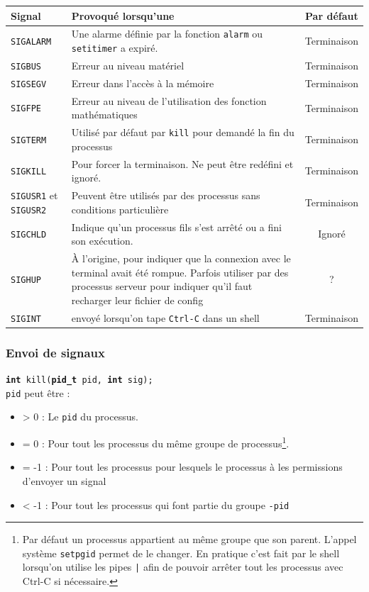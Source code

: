 \begin{tabularx}{\textwidth}{l|p{}|c}
  \textbf{Signal} & \textbf{Provoqué lorsqu'une} & \textbf{Par défaut} \\
  \hline \hline
  \texttt{SIGALARM} & Une alarme définie par la fonction \texttt{alarm} ou \texttt{setitimer} a expiré. & Terminaison \\
  \hline
  \texttt{SIGBUS} & Erreur au niveau matériel & Terminaison \\
  \hline
  \texttt{SIGSEGV} & Erreur dans l'accès à la mémoire & Terminaison \\
  \hline
  \texttt{SIGFPE} & Erreur au niveau de l'utilisation des fonction mathématiques &  Terminaison \\
  \hline
  \texttt{SIGTERM} & Utilisé par défaut par \texttt{kill} pour demandé la fin du processus & Terminaison \\
  \hline
  \texttt{SIGKILL} & Pour forcer la terminaison. Ne peut être redéfini et ignoré. & Terminaison \\
  \hline
  \texttt{SIGUSR1} et \texttt{SIGUSR2} & Peuvent être utilisés par des processus sans conditions particulière & Terminaison \\
  \hline
  \texttt{SIGCHLD} & Indique qu'un processus fils s'est arrêté ou a fini son exécution. & Ignoré \\
  \hline
  \texttt{SIGHUP} & À l'origine, pour indiquer que la connexion avec le terminal avait été rompue. Parfois utiliser par des processus serveur pour indiquer qu'il faut recharger leur fichier de config & ? \\
  \hline
  \texttt{SIGINT} & envoyé lorsqu'on tape \texttt{Ctrl-C} dans un shell & Terminaison \\
  \hline
\end{tabularx}

\subsubsection{Envoi de signaux}
\texttt{\textbf{int} kill(\textbf{pid\_t} pid, \textbf{int} sig);}\\
\texttt{pid} peut être :
\begin{itemize}
  \item > 0 : Le \texttt{pid} du processus.
  \item = 0 : Pour tout les processus du même groupe de processus\footnote{Par défaut un processus appartient au même groupe que son parent. L'appel système \texttt{setpgid} permet de le changer. En pratique c'est fait par le shell lorsqu'on utilise les pipes \texttt{|} afin de pouvoir arrêter tout les processus avec Ctrl-C si nécessaire.}.
  \item = -1 : Pour tout les processus pour lesquels le processus à les permissions d'envoyer un signal
  \item < -1 : Pour tout les processus qui font partie du groupe \texttt{-pid}
\end{itemize}
